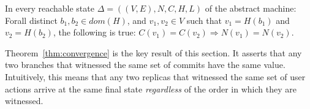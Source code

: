 \begin{theorem}[{\bf Convergence}]
  \label{thm:convergence}
  In every reachable state $\Delta = ((V,E),N,C,H,L)$ of the abstract
  machine: Forall distinct $b_1, b_2 \in dom(H)$, and $v_1, v_2 \in V$
  such that $v_1 = H(b_1)$ and $v_2 = H(b_2)$, the following is true:
  $C(v_1) = C(v_2) \Rightarrow N(v_1) = N(v_2)$.
\end{theorem}

Theorem~\ref{thm:convergence} is the key result of this section. It
asserts that any two branches that witnessed the same set of commits
have the same value. Intuitively, this means that any two replicas
that witnessed the same set of user actions arrive at the same final
state \emph{regardless} of the order in which they are witnessed. 

